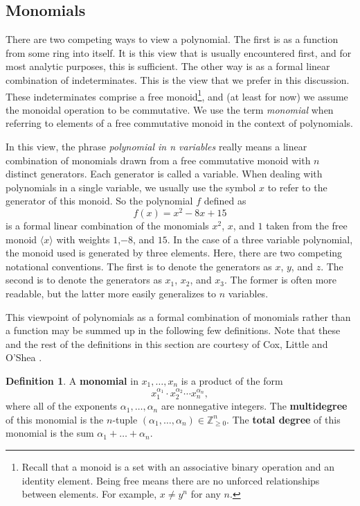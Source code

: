 \documentclass[MS, xcolor=dvipsnames]{wfuthesis}
\def\bZ{\mathbb{Z}}
\theoremstyle{definition}
\newtheorem{definition}[theorem]{Definition}
\begin{document}
\subsection{Monomials}
There are two competing ways to view a polynomial. The first is as a function from some ring into itself. It is this view that is usually encountered first, and for most analytic purposes, this is sufficient. The other way is as a formal linear combination of indeterminates. This is the view that we prefer in this discussion. These indeterminates comprise a free monoid\footnote{Recall that a monoid is a set with an associative binary operation and an identity element. Being free means there are no unforced relationships between elements. For example, $x \ne y^n$ for any $n$.}, and (at least for now) we assume the monoidal operation to be commutative. We use the term \textit{monomial} when referring to elements of a free commutative monoid in the context of polynomials. \par
In this view, the phrase \textit{polynomial in n variables} really means a linear combination of monomials drawn from a free commutative monoid with $n$ distinct generators. Each generator is called a variable. When dealing with polynomials in a single variable, we usually use the symbol $x$ to refer to the generator of this monoid. So the polynomial $f$ defined as
\[ f(x) = x^2-8x+15 \]
is a formal linear combination of the monomials $x^2$, $x$, and $1$ taken from the free monoid $\langle x \rangle$ with weights $1$,$-8$, and $15$. In the case of a three variable polynomial, the monoid used is generated by three elements. Here, there are two competing notational conventions. The first is to denote the generators as $x$, $y$, and $z$. The second is to denote the generators as $x_1$, $x_2$, and $x_3$. The former is often more readable, but the latter more easily generalizes to $n$ variables. \par
This viewpoint of polynomials as a formal combination of monomials rather than a function may be summed up in the following few definitions. Note that these and the rest of the definitions in this section are courtesy of Cox, Little and O'Shea \cite{Cox2015}.
\begin{definition}
  A \textbf{monomial} in $x_1,\dots,x_n$ is a product of the form
  \[ x_1^{\alpha_1} \cdot x_2^{\alpha_2} \cdots x_n^{\alpha_n}, \]
  where all of the exponents $\alpha_1,\dots,\alpha_n$ are nonnegative integers. The \textbf{multidegree} of this monomial is the $n$-tuple $(\alpha_1,\dots,\alpha_n) \in \bZ_{\ge0}^n$. The \textbf{total degree} of this monomial is the sum $\alpha_1 + \dots + \alpha_n$.
\end{definition}
\end{document}
